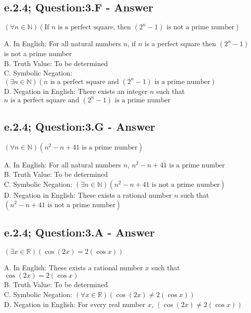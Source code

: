 \subsection{e.2.4; Question:3.F - Answer}
	\begin{center}
		$(\forall n \in \mathbb{N})(\text{If } n \text{ is a perfect square, then } (2^n - 1) \text{ is not a prime number})$
	\end{center}
A. In English: For all natural numbers $n$, if $n$ is a perfect square then $(2^n - 1)$ is not a prime number \\
B. Truth Value: To be determined \\
C. Symbolic Negation: $(\exists n \in \mathbb{N})(n \text{ is a perfect square and } (2^n - 1) \text{ is a prime number})$ \\
D. Negation in English: There exists an integer $n$ such that $n \text{ is a perfect square and } (2^n - 1) \text{ is a prime number} $ \\


\subsection{e.2.4; Question:3.G - Answer}
	\begin{center}
		$(\forall n \in \mathbb{N})(n^2 - n + 41 \text{ is a prime number})$
	\end{center}
A. In English: For all natural numbers $n$, $n^2 - n + 41 \text{ is a prime number}$ \\
B. Truth Value: To be determined \\
C. Symbolic Negation: $(\exists n \in \mathbb{N})(n^2 - n + 41 \text{ is not a prime number})$ \\
D. Negation in English: These exists a rational number $n$ such that  $(n^2 - n + 41 \text{ is not a prime number})$ \\


\subsection{e.2.4; Question:3.A - Answer}
	\begin{center}
		$(\exists x \in \mathbb{R})(\cos (2x) = 2(\cos x))$
	\end{center}
A. In English: These exists a rational number $x$ such that $\cos (2x) = 2(\cos x)$ \\
B. Truth Value: To be determined \\
C. Symbolic Negation: $(\forall x \in \mathbb{R})(\cos (2x) \neq 2(\cos x))$ \\
D. Negation in English: For every real number $x$, $(\cos (2x) \neq 2(\cos x))$ \\

















